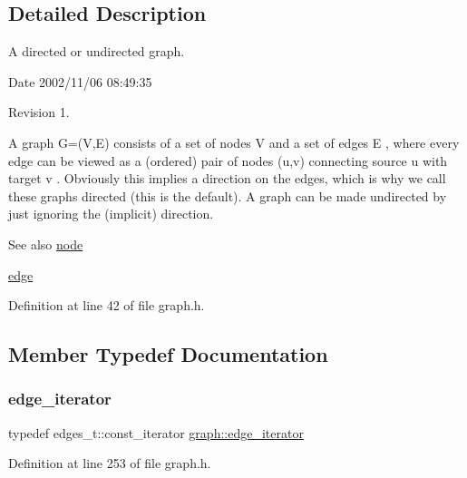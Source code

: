 \subsection{Detailed Description}
A directed or undirected graph. 

\begin{DoxyParagraph}{Date}
2002/11/06 08\+:49\+:35 
\end{DoxyParagraph}
\begin{DoxyParagraph}{Revision}
1. 
\end{DoxyParagraph}


A graph G=(V,E) consists of a set of nodes V and a set of edges E , where every edge can be viewed as a (ordered) pair of nodes (u,v) connecting source u with target v . Obviously this implies a direction on the edges, which is why we call these graphs directed (this is the default). A graph can be made undirected by just ignoring the (implicit) direction.

\begin{DoxySeeAlso}{See also}
\mbox{\hyperlink{classnode}{node}} 

\mbox{\hyperlink{classedge}{edge}} 
\end{DoxySeeAlso}


Definition at line 42 of file graph.\+h.



\subsection{Member Typedef Documentation}
\mbox{\label{classgraph_a818d3766018eb0af91d520ce2150203c}} 
\subsubsection{\texorpdfstring{edge\+\_\+iterator}{edge\_iterator}}
{\footnotesize\ttfamily typedef edges\+\_\+t\+::const\+\_\+iterator \mbox{\hyperlink{classgraph_a818d3766018eb0af91d520ce2150203c}{graph\+::edge\+\_\+iterator}}}



Definition at line 253 of file graph.\+h.

\mbox{\label{classgraph_a2cb374b84c133ce13f94e73c3e5da7fa}} 
